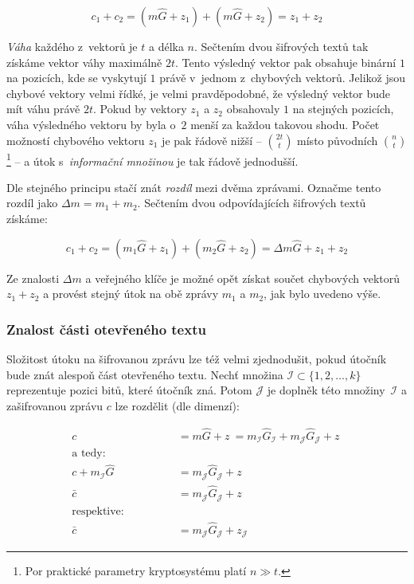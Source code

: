 \documentclass[thesis=M,czech,hidelinks]{FITthesis}[2012/06/26]
\newcommand{\0}{{\textcolor[gray]{0.80}{0}}}
\begin{document}
$$ c_1 + c_2 = (m\hat{G} + z_1) + (m\hat{G} + z_2) = z_1 + z_2 $$

\emph{Váha} každého z~vektorů je $t$ a délka $n$. Sečtením dvou šifrových textů
tak získáme vektor váhy maximálně $2t$. Tento výsledný vektor pak obsahuje
binární $1$ na pozicích, kde se vyskytují $1$ právě v~jednom z~chybových
vektorů. Jelikož jsou chybové vektory velmi řídké, je velmi pravděpodobné, že
výsledný vektor bude mít váhu právě $2t$. Pokud by vektory $z_1$ a $z_2$
obsahovaly $1$ na stejných pozicích, váha výsledného vektoru by byla o~$2$ menší
za každou takovou shodu. Počet možností chybového vektoru $z_1$ je pak řádově
nižší -- $\binom{2t}{t}$ místo původních $\binom{n}{t}$\footnote{
    Por praktické parametry kryptosystému platí $n \gg t$.
} -- a útok s~\emph{informační množinou} je tak řádově jednodušší.

Dle stejného principu stačí znát \emph{rozdíl} mezi dvěma zprávami. Označme
tento rozdíl jako $\Delta m = m_1 + m_2$. Sečtením dvou odpovídajících šifrových
textů získáme:

$$ c_1 + c_2 = (m_1\hat{G} + z_1) + (m_2\hat{G} + z_2) = \Delta m \hat{G} + z_1 + z_2 $$

Ze znalosti $\Delta m$ a veřejného klíče je možné opět získat součet chybových
vektorů $z_1 + z_2 $ a provést stejný útok na obě zprávy $m_1$ a $m_2$, jak bylo
uvedeno výše.


\subsubsection{Znalost části otevřeného textu}
Složitost útoku na šifrovanou zprávu lze též velmi zjednodušit, pokud útočník
bude znát alespoň část otevřeného textu. Nechť množina $\mathcal{I} \subset
\{1,2,\ldots,k\}$ reprezentuje pozici bitů, které útočník zná. Potom
$\mathcal{J}$ je doplněk této množiny~$\mathcal{I}$ a zašifrovanou zprávu $c$
lze rozdělit (dle dimenzí):

\begin{align*}
    c &= m\hat{G} + z~=
    m_{\mathcal{I}}\hat{G}_{\mathcal{I}} + m_{\mathcal{J}}\hat{G}_{\mathcal{J}} + z~\\
    \text{a tedy:} \qquad \qquad \\
    c + m_{\mathcal{I}}\hat{G} &= m_{\mathcal{J}}\hat{G}_{\mathcal{J}} + z~\\
                       \bar{c} &= m_{\mathcal{J}}\hat{G}_{\mathcal{J}} + z~\\
    \text{respektive:} \qquad \qquad \\
                       \bar{c} &= m_{\mathcal{J}}\hat{G}_{\mathcal{J}} + z_{\mathcal{J}}
\end{align*}
\end{document}
